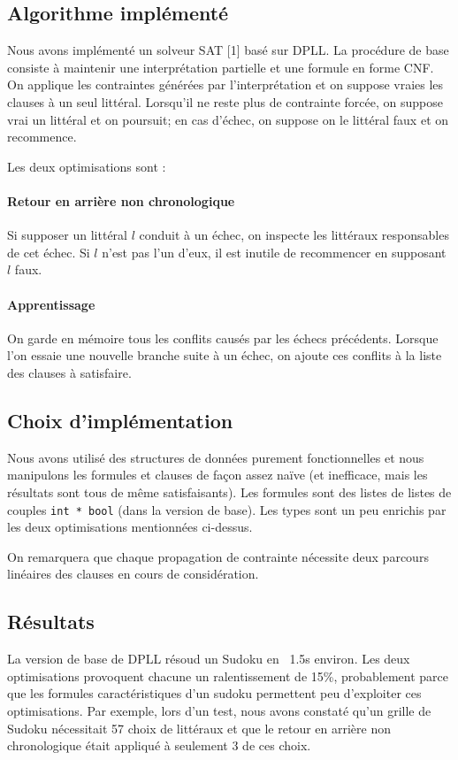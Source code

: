 \documentclass[10pt,a4paper]{article}
\begin{document}
\subsection{Algorithme implémenté}

Nous avons implémenté un solveur SAT [1] basé sur DPLL. La procédure de base
consiste à maintenir une interprétation partielle et une formule en forme CNF.
On applique les contraintes générées par l'interprétation et on suppose vraies
les clauses à un seul littéral. Lorsqu'il ne reste plus de contrainte forcée,
on suppose vrai un littéral et on poursuit; en cas d'échec, on suppose on le
littéral faux et on recommence.

Les deux optimisations sont :

\paragraph{Retour en arrière non chronologique}

Si supposer un littéral $l$ conduit à un échec, on inspecte les littéraux
responsables de cet échec. Si $l$ n'est pas l'un d'eux, il est inutile de
recommencer en supposant $l$ faux.

\paragraph{Apprentissage}

On garde en mémoire tous les conflits causés par les échecs précédents. Lorsque
l'on essaie une nouvelle branche suite à un échec, on ajoute ces conflits à la
liste des clauses à satisfaire.

\subsection{Choix d'implémentation} Nous avons utilisé des structures de
données purement fonctionnelles et nous manipulons les formules et clauses de
façon assez naïve (et inefficace, mais les résultats sont tous de même
satisfaisants). Les formules sont des listes de listes de couples {\tt int * bool}
(dans la version de base). Les types sont un peu enrichis par les deux
optimisations mentionnées ci-dessus.

On remarquera que chaque propagation de contrainte nécessite deux parcours
linéaires des clauses en cours de considération.

\subsection{Résultats} La version de base de DPLL résoud un Sudoku en ~1.5s
environ. Les deux optimisations provoquent chacune un ralentissement de 15\%,
probablement parce que les formules caractéristiques d'un sudoku permettent peu
d'exploiter ces optimisations. Par exemple, lors d'un test, nous avons constaté
qu'un grille de Sudoku nécessitait 57 choix de littéraux et que le retour en
arrière non chronologique était appliqué à seulement 3 de ces choix.
\end{document}
